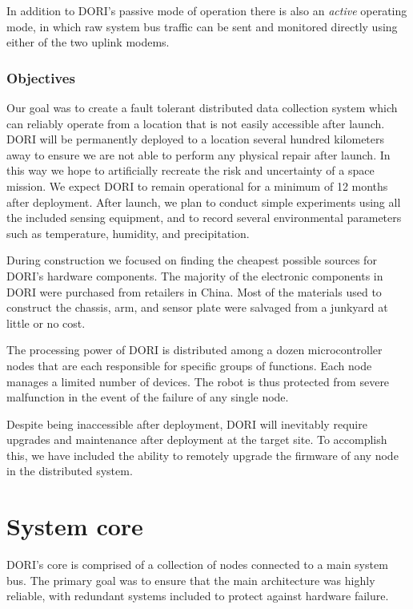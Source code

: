     In addition to DORI's passive mode of operation there is also an \emph{active} operating mode, in which raw system bus traffic can be sent and monitored directly using either of the two uplink modems.

\subsection{Objectives}
Our goal was to create a fault tolerant distributed data collection system which can reliably operate from a location that is not easily accessible after launch. DORI will be permanently deployed to a location several hundred kilometers away to ensure we are not able to perform any physical repair after launch. In this way we hope to artificially recreate the risk and uncertainty of a space mission. We expect \textsc{DORI} to remain operational for a minimum of 12 months after deployment. After launch, we plan to conduct simple experiments using all the included sensing equipment, and to record several environmental parameters such as temperature, humidity, and precipitation.

During construction we focused on finding the cheapest possible sources for \textsc{DORI}'s hardware components. The majority of the electronic components in \textsc{DORI} were purchased from retailers in China. Most of the materials used to construct the chassis, arm, and sensor plate were salvaged from a junkyard at little or no cost. 

The processing power of \textsc{DORI} is distributed among a dozen microcontroller nodes that are each responsible for specific groups of functions. Each node manages a limited number of devices. The robot is thus protected from severe malfunction in the event of the failure of any single node.

Despite being inaccessible after deployment, \textsc{DORI} will inevitably require upgrades and maintenance after deployment at the target site. To accomplish this, we have included the ability to remotely upgrade the firmware of any node in the distributed system.




\chapter{System core}
DORI's core is comprised of a collection of nodes connected to a main system bus. The primary goal was to ensure that the main architecture was highly reliable, with redundant systems included to protect against hardware failure. 


